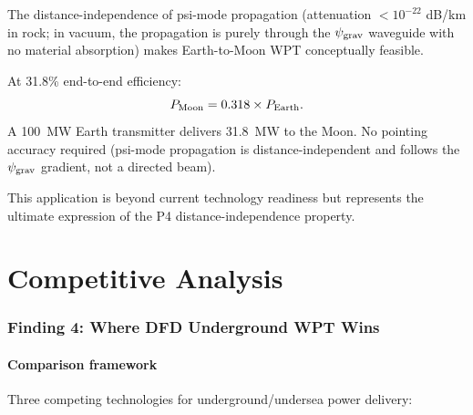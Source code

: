 \documentclass[11pt]{article}
\newcommand{\psigrav}{\psi_{\rm grav}}
\begin{document}
The distance-independence of psi-mode propagation (attenuation $< 10^{-22}$
dB/km in rock; in vacuum, the propagation is purely through the $\psigrav$
waveguide with no material absorption) makes Earth-to-Moon WPT
conceptually feasible.

At 31.8\% end-to-end efficiency:
\begin{equation}
P_{\rm Moon} = 0.318 \times P_{\rm Earth}.
\end{equation}
A 100~MW Earth transmitter delivers 31.8~MW to the Moon.
No pointing accuracy required (psi-mode propagation is distance-independent
and follows the $\psigrav$ gradient, not a directed beam).

This application is beyond current technology readiness but represents the
ultimate expression of the P4 distance-independence property.

\part{Competitive Analysis}
\label{part:competitive}

\section{Finding 4: Where DFD Underground WPT Wins}
\label{sec:competitive}

\subsection{Comparison framework}

Three competing technologies for underground/undersea power delivery:
\end{document}
